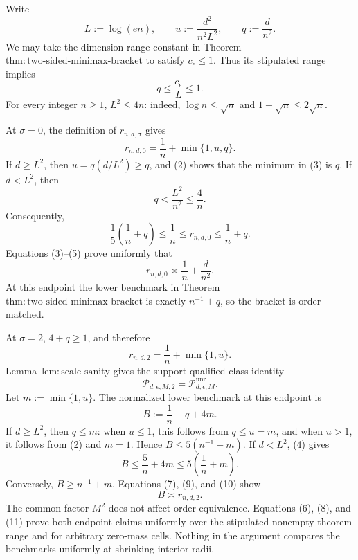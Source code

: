 Write
\[
 L:=\log(en),\qquad
 u:=\frac{d^2}{n^2L^2},\qquad
 q:=\frac d{n^2}.
\tag{1}
\]
We may take the dimension-range constant in Theorem~\(\mathrm{thm:two\text{-}sided\text{-}minimax\text{-}bracket}\) to satisfy \(c_{\epsilon}\le1\).  Thus its stipulated range implies
\[
 q\le\frac{c_{\epsilon}}L\le1.
\tag{2}
\]
For every integer \(n\ge1\), \(L^2\le4n\): indeed, \(\log n\le\sqrt n\) and \(1+\sqrt n\le2\sqrt n\).

At \(\sigma=0\), the definition of \(r_{n,d,\sigma}\) gives
\[
 r_{n,d,0}=\frac1n+\min\{1,u,q\}.
\tag{3}
\]
If \(d\ge L^2\), then \(u=q(d/L^2)\ge q\), and (2) shows that the minimum in (3) is \(q\).  If \(d<L^2\), then
\[
 q<\frac{L^2}{n^2}\le\frac4n.
\tag{4}
\]
Consequently,
\[
 \frac15\left(\frac1n+q\right)
 \le \frac1n
 \le r_{n,d,0}
 \le \frac1n+q.
\tag{5}
\]
Equations (3)--(5) prove uniformly that
\[
 r_{n,d,0}\asymp \frac1n+\frac d{n^2}.
\tag{6}
\]
At this endpoint the lower benchmark in Theorem~\(\mathrm{thm:two\text{-}sided\text{-}minimax\text{-}bracket}\) is exactly \(n^{-1}+q\), so the bracket is order-matched.

At \(\sigma=2\), \(4+q\ge1\), and therefore
\[
 r_{n,d,2}=\frac1n+\min\{1,u\}.
\tag{7}
\]
Lemma~\(\mathrm{lem:scale\text{-}sanity}\) gives the support-qualified class identity
\[
 \mathcal P_{d,\epsilon,M,2}=\mathcal P_{d,\epsilon,M}^{\mathrm{unr}}.
\tag{8}
\]
Let \(m:=\min\{1,u\}\).  The normalized lower benchmark at this endpoint is
\[
 B:=\frac1n+q+4m.
\tag{9}
\]
If \(d\ge L^2\), then \(q\le m\): when \(u\le1\), this follows from \(q\le u=m\), and when \(u>1\), it follows from (2) and \(m=1\).  Hence \(B\le5(n^{-1}+m)\).  If \(d<L^2\), (4) gives
\[
 B\le\frac5n+4m\le5\left(\frac1n+m\right).
\tag{10}
\]
Conversely, \(B\ge n^{-1}+m\).  Equations (7), (9), and (10) show
\[
 B\asymp r_{n,d,2}.
\tag{11}
\]
The common factor \(M^2\) does not affect order equivalence.  Equations (6), (8), and (11) prove both endpoint claims uniformly over the stipulated nonempty theorem range and for arbitrary zero-mass cells.  Nothing in the argument compares the benchmarks uniformly at shrinking interior radii.